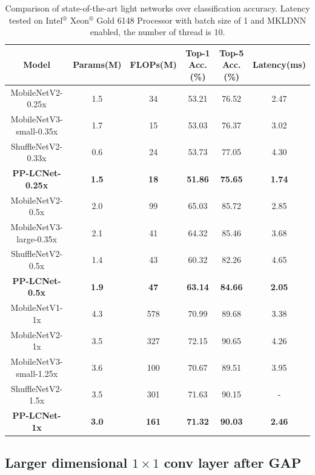 \documentclass[final]{cvpr}
\begin{document}
\begin{table}[!htbp]
\centering
\begin{center}
\begin{tabular}{c|c|c|c|c|c}
\toprule[1pt]
Model & Params(M) & FLOPs(M) & Top-1 Acc.(\%) & Top-5 Acc.(\%) & Latency(ms) \\
\midrule[1pt]
MobileNetV2-0.25x     & 1.5     & 34     & 53.21	 & 76.52 & 2.47 \\
MobileNetV3-small-0.35x    & 1.7     & 15     & 53.03 & 76.37  & 3.02 \\
ShuffleNetV2-0.33x & 0.6     & 24     & 53.73  & 77.05  & 4.30 \\

\textbf{PP-LCNet-0.25x}    & \textbf{1.5}    & \textbf{18}    & \textbf{51.86}  & \textbf{75.65} & \textbf{1.74} \\
\hline
MobileNetV2-0.5x      & 2.0     & 99     & 65.03 & 85.72 & 2.85 \\
MobileNetV3-large-0.35x & 2.1 & 41  & 64.32  & 85.46  & 3.68 \\
ShuffleNetV2-0.5x     & 1.4     & 43 & 60.32    & 82.26  & 4.65 \\ 
\textbf{PP-LCNet-0.5x} & \textbf{1.9}  & \textbf{47}   & \textbf{63.14}      & \textbf{84.66}  &\textbf{2.05}\\ 

\hline
MobileNetV1-1x  & 4.3   & 578     & 	70.99 & 89.68 & 3.38 \\
MobileNetV2-1x  &  3.5  & 327     & 72.15 & 90.65 & 4.26 \\
MobileNetV3-small-1.25x & 3.6 & 100  & 70.67  & 89.51  & 3.95 \\
ShuffleNetV2-1.5x   & 3.5   & 301 & 71.63    & 90.15  & - \\ 
\textbf{PP-LCNet-1x}   & \textbf{3.0}  & \textbf{161}  & \textbf{71.32}    & \textbf{90.03}    &\textbf{2.46}\\ 

\bottomrule[1pt]
\end{tabular}
\end{center}

\caption{Comparison of state-of-the-art light networks over classification accuracy. Latency tested on Intel$^\circledR$ Xeon$^\circledR$ Gold 6148 Processor with batch size of 1 and  MKLDNN enabled, the number of thread is 10.}
\label{tab-state-of-the-art}
\end{table}


\subsection{Larger dimensional $1 \times 1$ conv layer after GAP}
\end{document}
